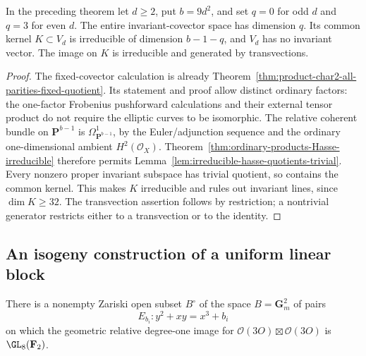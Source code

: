 \begin{corollary}
\label{cor:ordinary-products-irreducible-kernel}
In the preceding theorem let $d\ge2$, put $b=9d^2$, and set
$q=0$ for odd $d$ and $q=3$ for even $d$.
The entire invariant-covector space has dimension $q$.
Its common kernel $K\subset V_d$ is irreducible of dimension
$b-1-q$, and $V_d$ has no invariant vector.
The image on $K$ is irreducible and generated by transvections.
\end{corollary}

\begin{proof}
The fixed-covector calculation is already
Theorem~\ref{thm:product-char2-all-parities-fixed-quotient}.
Its statement and proof allow distinct ordinary factors: the
one-factor Frobenius pushforward calculations and their external
tensor product do not require the elliptic curves to be isomorphic.
The relative coherent bundle on $\mathbf P^{b-1}$ is
$\Omega^1_{\mathbf P^{b-1}}$, by the Euler/adjunction sequence
and the ordinary one-dimensional ambient $H^2(\mathcal O_X)$.
Theorem~\ref{thm:ordinary-products-Hasse-irreducible} therefore
permits Lemma~\ref{lem:irreducible-hasse-quotients-trivial}.
Every nonzero proper invariant subspace has trivial quotient,
so contains the common kernel. This makes $K$ irreducible and
rules out invariant lines, since $\dim K\ge32$.
The transvection assertion follows by restriction; a nontrivial
generator restricts either to a transvection or to the identity.
\end{proof}


\subsection{An isogeny construction of a uniform linear block}
\label{subsec:ordinary-products-isogeny-full}

\begin{lemma}
\label{lem:ordinary-pair-GL8-open}
There is a nonempty Zariski open subset $B^\circ$ of the space
$B=\mathbf G_m^2$ of pairs
\[
 E_{b_i}:y^2+xy=x^3+b_i
\]
on which the geometric relative degree-one image for
$\mathcal O(3O)\boxtimes\mathcal O(3O)$ is
$\GL_8(\mathbf F_2)$.
\end{lemma}

